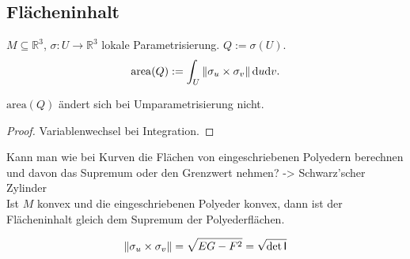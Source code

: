 \documentclass[11pt]{article}
\begin{document}
\subsection{Flächeninhalt}
\begin{definition}
$M\subseteq \mathbb R^3$, $\sigma: U\to \mathbb R^3$ lokale Parametrisierung. $Q:= \sigma(U)$. \begin{equation*}
    \mathrm{area}(Q):= \int_{U}\left\lVert\sigma_u\times \sigma_v\right\rVert\mathrm{d} u\mathrm{d} v.
\end{equation*}
\end{definition}
\begin{lemma}
$\mathrm{area}(Q)$ ändert sich bei Umparametrisierung nicht. 
\end{lemma}
\begin{proof}
Variablenwechsel bei Integration. 
\end{proof}
\begin{remark}
Kann man wie bei Kurven die Flächen von eingeschriebenen Polyedern berechnen und davon das Supremum oder den Grenzwert nehmen? -> Schwarz'scher Zylinder\\
Ist $M$ konvex und die eingeschriebenen Polyeder konvex, dann ist der Flächeninhalt gleich dem Supremum der Polyederflächen.
\end{remark}
\begin{lemma}
\begin{equation*}
    \left\lVert\sigma_u\times \sigma_v\right\rVert = \sqrt{EG-F^2} = \sqrt{\det \mathsf I}
\end{equation*}
\end{lemma}
\end{document}
